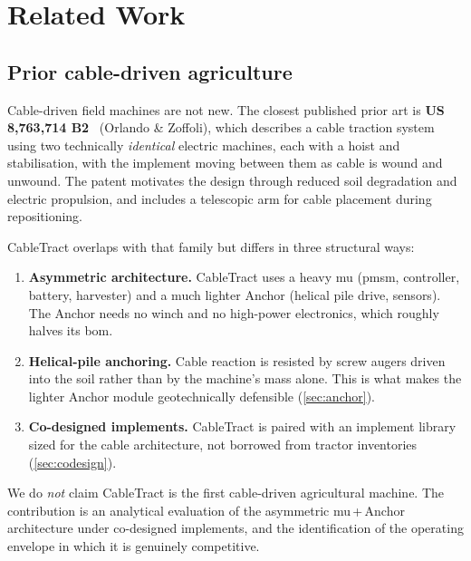 \documentclass[11pt,a4paper]{article}
\begin{document}
\section{Related Work}\label{sec:related}

\subsection{Prior cable-driven agriculture}\label{sec:related-cable}

Cable-driven field machines are not new. The closest published prior art is \textbf{US 8,763,714 B2}~\cite{orlando2014patent} (Orlando \& Zoffoli), which describes a cable traction system using two technically \emph{identical} electric machines, each with a hoist and stabilisation, with the implement moving between them as cable is wound and unwound. The patent motivates the design through reduced soil degradation and electric propulsion, and includes a telescopic arm for cable placement during repositioning.

CableTract overlaps with that family but differs in three structural ways:

\begin{enumerate}[leftmargin=1.6em,itemsep=0.2em]
    \item \textbf{Asymmetric architecture.} CableTract uses a heavy \gls{mu} (\gls{pmsm}, controller, battery, harvester) and a much lighter Anchor (helical pile drive, sensors). The Anchor needs no winch and no high-power electronics, which roughly halves its \gls{bom}.
    \item \textbf{Helical-pile anchoring.} Cable reaction is resisted by screw augers driven into the soil rather than by the machine's mass alone. This is what makes the lighter Anchor module geotechnically defensible (\cref{sec:anchor}).
    \item \textbf{Co-designed implements.} CableTract is paired with an implement library sized for the cable architecture, not borrowed from tractor inventories (\cref{sec:codesign}).
\end{enumerate}

We do \emph{not} claim CableTract is the first cable-driven agricultural machine. The contribution is an analytical evaluation of the asymmetric \gls{mu}\,+\,Anchor architecture under co-designed implements, and the identification of the operating envelope in which it is genuinely competitive.
\end{document}
